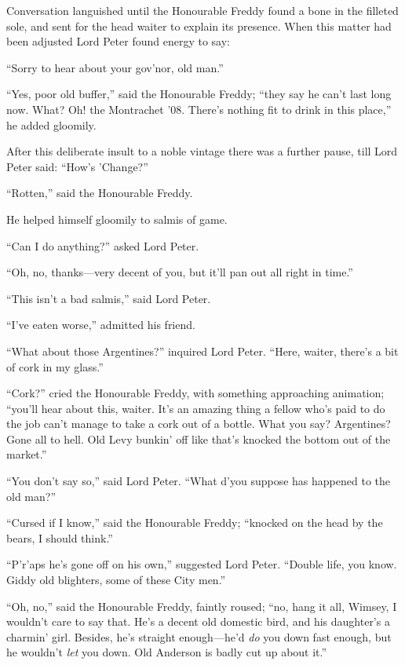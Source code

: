 Conversation languished until the Honourable Freddy found a bone in the filleted sole, and sent for the head waiter to explain its presence. When this matter had been adjusted Lord Peter found energy to say:

\enquote{Sorry to hear about your gov’nor, old man.}

\enquote{Yes, poor old buffer,} said the Honourable Freddy; \enquote{they say he can’t last long now. What? Oh! the Montrachet ’08. There’s nothing fit to drink in this place,} he added gloomily.

After this deliberate insult to a noble vintage there was a further pause, till Lord Peter said: \enquote{How’s ’Change?}

\enquote{Rotten,} said the Honourable Freddy.

He helped himself gloomily to salmis of game.

\enquote{Can I do anything?} asked Lord Peter.

\enquote{Oh, no, thanks\allowbreak---\allowbreak very decent of you, but it’ll pan out all right in time.}

\enquote{This isn’t a bad salmis,} said Lord Peter.

\enquote{I’ve eaten worse,} admitted his friend.

\enquote{What about those Argentines?} inquired Lord Peter. \enquote{Here, waiter, there’s a bit of cork in my glass.}

\enquote{Cork?} cried the Honourable Freddy, with something approaching animation; \enquote{you’ll hear about this, waiter. It’s an amazing thing a fellow who’s paid to do the job can’t manage to take a cork out of a bottle. What you say? Argentines? Gone all to hell. Old Levy bunkin’ off like that’s knocked the bottom out of the market.}

\enquote{You don’t say so,} said Lord Peter. \enquote{What d’you suppose has happened to the old man?}

\enquote{Cursed if I know,} said the Honourable Freddy; \enquote{knocked on the head by the bears, I should think.}

\enquote{P’r’aps he’s gone off on his own,} suggested Lord Peter. \enquote{Double life, you know. Giddy old blighters, some of these City men.}

\enquote{Oh, no,} said the Honourable Freddy, faintly roused; \enquote{no, hang it all, Wimsey, I wouldn’t care to say that. He’s a decent old domestic bird, and his daughter’s a charmin’ girl. Besides, he’s straight enough\allowbreak---\allowbreak he’d \textit{do} you down fast enough, but he wouldn’t \textit{let} you down. Old Anderson is badly cut up about it.}

